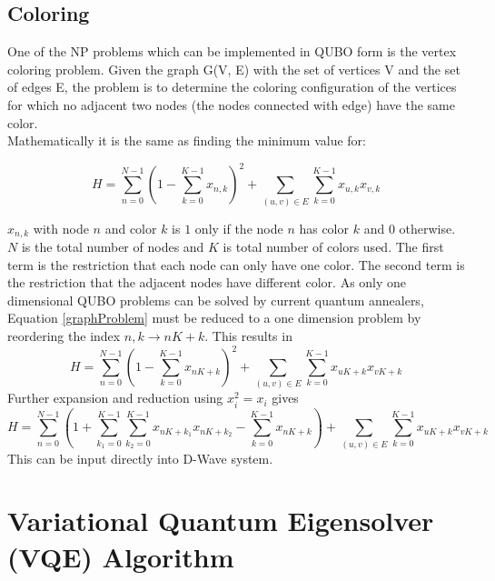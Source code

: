 \subsection{Coloring}

 One of the NP problems which can be implemented in QUBO form is the vertex coloring problem.
 Given the graph G(V, E) with the set of vertices V and the set of edges E, the problem is to determine the coloring configuration of the vertices for which no adjacent two nodes (the nodes connected with edge) have the same color. \\ 
Mathematically it is the same as finding the minimum value for:

\begin{equation}\label{graphProblem}
H = \sum_{n=0}^{N-1}(1-\sum_{k=0}^{K-1}x_{n,k})^2 + \sum_{(u,v)\in E}\sum_{k=0}^{K-1}x_{u,k}x_{v,k}
\end{equation}

$x_{n,k}$ with node $n$ and color $k$ is $1$ only if the node $n$ has color $k$ and $0$ otherwise. $N$ is the total number of nodes and $K$ is total number of colors used. The first term is the restriction that each node can only have one color. The second term is the restriction that the adjacent nodes have different color. As only one dimensional QUBO problems can be solved by current quantum annealers, Equation \ref{graphProblem} must be reduced to a one dimension problem by reordering the index $n,k \rightarrow nK+k$.
This results in
\begin{equation}
H = \sum_{n=0}^{N-1}(1-\sum_{k=0}^{K-1}x_{nK+k})^2 + \sum_{(u,v)\in E}\sum_{k=0}^{K-1}x_{uK+k}x_{vK+k}
\end{equation}
Further expansion and reduction using $x_i^2=x_i$ gives
\begin{equation}
H= \sum_{n=0}^{N-1}(1+\sum_{k_1=0}^{K-1}\sum_{k_2=0}^{K-1}x_{nK+k_1}x_{nK+k_2}-\sum_{k=0}^{K-1}x_{nK+k})+ \sum_{(u,v)\in E}\sum_{k=0}^{K-1}x_{uK+k}x_{vK+k}
\end{equation}
This can be input directly into D-Wave system.

\section{Variational Quantum Eigensolver (VQE) Algorithm}\label{sec:VQESolver}


